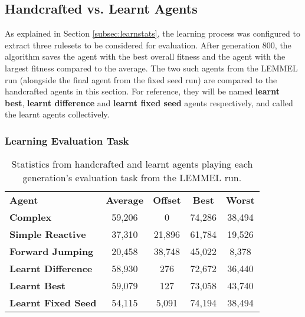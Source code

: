 
\subsection{Handcrafted vs. Learnt Agents}
\label{subsec:evallearnt}

As explained in Section \ref{subsec:learnstats}, the learning process was configured to extract three rulesets to be considered for evaluation. After generation 800, the algorithm saves the agent with the best overall fitness and the agent with the largest fitness compared to the average. The two such agents from the LEMMEL run (alongside the final agent from the fixed seed run) are compared to the handcrafted agents in this section. For reference, they will be named \textbf{learnt best}, \textbf{learnt difference} and \textbf{learnt fixed seed} agents respectively, and called the learnt agents collectively.

\subsubsection{Learning Evaluation Task}

\begin{table}[t]
  \begin{adjustwidth}{-0cm}{-0cm}
  \begin{center} \small
    \begin{tabular}{ | l | c | c | c | c |}
    \hline
    \textbf{Agent} & \textbf{Average} & \textbf{Offset} & \textbf{Best} & \textbf{Worst} \TBstrut \\ \thickhline
    \textbf{Complex} & 59,206 & 0 & 74,286 & 38,494  \\ \hline
    \textbf{Simple Reactive} & 37,310 & 21,896 & 61,784 & 19,526 \\ \hline
    \textbf{Forward Jumping} & 20,458 & 38,748 & 45,022 & 8,378 \\ \thickhline
    \textbf{Learnt Difference} & 58,930 & 276 & 72,672 & 36,440  \\ \hline
    \textbf{Learnt Best} & 59,079 & 127 & 73,058 & 43,740  \\ \hline
    \textbf{Learnt Fixed Seed} & 54,115 & 5,091 & 74,194 & 38,494  \\ \hline
    \end{tabular}
  \end{center}
  \end{adjustwidth}
  \caption{\small Statistics from handcrafted and learnt agents playing each generation's evaluation task from the LEMMEL run.}
  \label{tab:learnrunagents}
\end{table}

